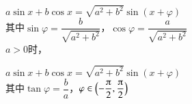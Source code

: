 \begin{description}[leftmargin=0pt,labelsep=0pt]
      \item%
        \begin{itemizeMy}
          \item $a\sin x+b\cos x=\sqrt{a^2+b^2}\sin(x+\varphi)$\\
          其中$\sin\varphi=\dfrac{b}{\sqrt{a^2+b^2}}$，$\cos\varphi=\dfrac{a}{\sqrt{a^2+b^2}}$\\
          $a>0$时，
          \item $a\sin x+b\cos x=\sqrt{a^2+b^2}\sin(x+\varphi)$\\
          其中$\tan\varphi=\dfrac{b}a$，$
          \varphi\in\Bigl(-\dfrac{\piup}2,\dfrac{\piup}2\Bigr)$
        \end{itemizeMy}
  \end{description}
